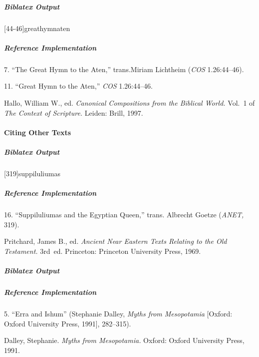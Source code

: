 \documentclass[a4paper]{article}
\newenvironment{biboutput}{%
  \subparagraph{Biblatex Output}
}{\color{black}}
\newenvironment{refimp}{%
  \subparagraph{Reference Implementation}
  \color{reference-colour}
  \rm
}{\par\color{black}}
\begin{document}
\begin{biboutput}
  [44-46]{greathymnaten}
\end{biboutput}

\begin{refimp}
  \hspace*{\bibindent}7. “The Great Hymn to the Aten,” trans.\@ Miriam Lichtheim
  (\emph{COS} 1.26:44–46).

  \hspace*{\bibindent}11. “Great Hymn to the Aten,” \emph{COS} 1.26:44–46.

  \hangindent\bibindent Hallo, William W., ed. \emph{Canonical Compositions
  from the Biblical World.} Vol.~1 of \emph{The Context of Scripture.} Leiden:
  Brill, 1997.

\end{refimp}

\paragraph{Citing Other Texts}

\begin{biboutput}
  [319]{suppiluliumas}
\end{biboutput}

\begin{refimp}
  \hspace*{\bibindent}16. “Suppiluliumas and the Egyptian Queen,” trans.\@
  Albrecht Goetze (\emph{ANET,} 319).

  \hangindent\bibindent Pritchard, James B., ed. \emph{Ancient Near Eastern
  Texts Relating to the Old Testament.} 3rd~ed. Princeton: Princeton
  University Press, 1969.

\end{refimp}

\begin{biboutput}
\end{biboutput}

\begin{refimp}
  \hspace*{\bibindent}5. “Erra and Ishum” (Stephanie Dalley, \emph{Myths from
  Mesopotamia} [Oxford: Oxford University Press, 1991], 282–315).
  
  \hangindent\bibindent Dalley, Stephanie. \emph{Myths from Mesopotamia.}
  Oxford: Oxford University Press, 1991.
\end{refimp}
\end{document}
